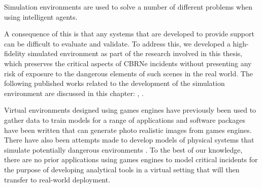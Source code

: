 Simulation environments are used to solve a number of different problems when using intelligent agents.

A consequence of this is that any systems that are developed to provide support can be difficult to evaluate and validate. To address this, we developed a high-fidelity simulated environment as part of the research involved in this thesis, which preserves the critical aspects of CBRNe incidents without presenting any risk of exposure to the dangerous elements of such scenes in the real world. The following published works related to the development of the simulation environment are discussed in this chapter: \citet{Smyth2018AInvestigation}, \citet{Smyth2018UsingDrones}.\par


Virtual environments designed using games engines have previously been used to gather data to train models for a range of applications \cite{1608.02192}\cite{uav_benchmark_simulator} and software packages have been written that can generate photo realistic images from games engines\cite{1609.01326}. There have also been attempts made to develop models of physical systems that simulate potentially dangerous environments \cite{4625089}. To the best of our knowledge, there are no prior applications using games engines to model critical incidents for the purpose of developing analytical tools in a virtual setting that will then transfer to real-world deployment.